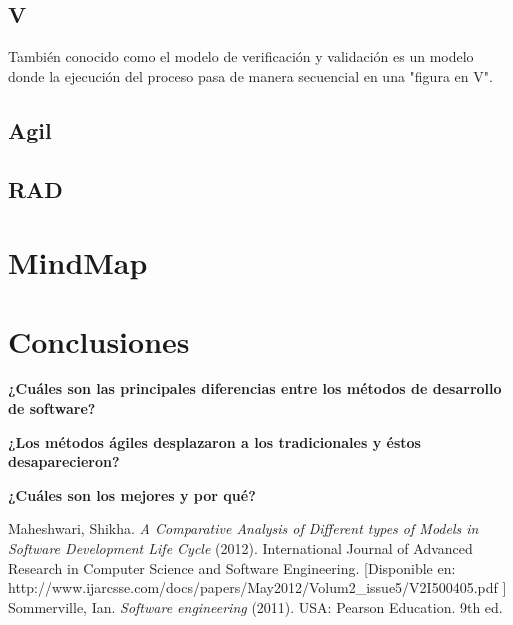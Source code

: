 \documentclass[spanish,12pt,letterpapper]{article}
\begin{document}
	\subsection{V}
	También conocido como el modelo de verificación y validación es un modelo donde la ejecución del proceso pasa de manera secuencial en una "figura en V".
	
	
	\subsection{Agil}
	\subsection{RAD}
	
	\section{MindMap}
	
	\section{Conclusiones}
	
    \textbf{¿Cuáles son las principales diferencias entre los métodos de desarrollo de software?}
    
    \textbf{¿Los métodos ágiles desplazaron a los tradicionales y éstos desaparecieron?}
    
    \textbf{¿Cuáles son los mejores y por qué?} 
	
	\pagebreak
	\begin{thebibliography}{9}
	  Maheshwari, Shikha. 
		\emph{A Comparative Analysis of Different types of Models in Software Development Life Cycle} (2012). International Journal of Advanced Research in Computer Science and Software Engineering. [Disponible en: http://www.ijarcsse.com/docs/papers/May2012/Volum2\_issue5/V2I500405.pdf ]
		  Sommerville, Ian. 
		\emph{Software engineering} (2011). USA:  Pearson Education. 9th ed. 
		
	\end{thebibliography}
	
	
	
	
\end{document}

